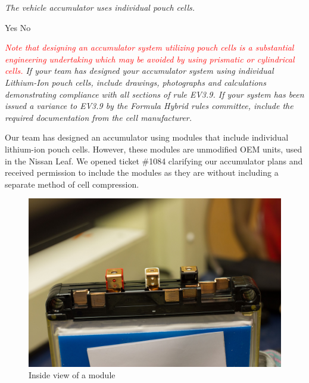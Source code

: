 \documentclass{article}
\begin{document}
    \textit{The vehicle accumulator uses individual pouch cells. } \par
    \makebox[0pt][l]{$\square$}\raisebox{.15ex}{\hspace{0.1em}} \hspace{0.2cm} Yes
    \makebox[0pt][l]{$\square$}\raisebox{.15ex}{\hspace{0.1em}$\checkmark$} \hspace{0.1cm} No

    \textit{\textcolor{red}{Note that designing an accumulator system utilizing pouch cells is a substantial engineering undertaking which may be avoided by using prismatic or cylindrical cells.} If your team has designed your accumulator system using individual Lithium-Ion pouch cells, include drawings, photographs and calculations demonstrating compliance with all sections of rule EV3.9. If your system has been issued a variance to EV3.9 by the Formula Hybrid rules committee, include the required documentation from the cell manufacturer.}

    Our team has designed an accumulator using modules that include individual lithium-ion pouch cells. However, these modules are unmodified OEM units, used in the Nissan Leaf. We opened ticket \#1084 clarifying our accumulator plans and received permission to include the modules as they are without including a separate method of cell compression.

        \begin{figure}[H]
            \centering
            \includegraphics[width = 0.7 \textwidth]{OpenModule}
            \caption{Inside view of a module }
            \label{canopener}
        \end{figure}

\end{document}
